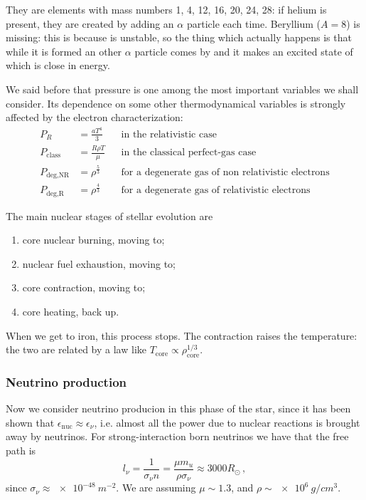 \documentclass[main.tex]{subfiles}
\begin{document}
\begin{bluebox}
They are elements with mass numbers 1, 4, 12, 16, 20, 24, 28: if helium is present, they are created by adding an \(\alpha \) particle each time. Beryllium (\(A = 8\)) is missing: this is because  is unstable, so the thing which actually happens is that while it is formed an other \(\alpha \) particle comes by and it makes an excited state of  which is close in energy.
\end{bluebox}
    
We said before that pressure is one among the most important variables we shall consider. Its dependence on some other thermodynamical variables is strongly affected by the electron characterization:
%
\begin{subequations}
\begin{align}
P_R &=\frac{aT^4}{3} && \text{in the relativistic case}\\
P_{\text{class}} &=\frac{R\rho T}{\mu} && \text{in the classical perfect-gas case}\\
P_{\text{deg,NR}} &=\rho^{\frac{5}{3}} && \text{for a degenerate gas of non relativistic electrons} \\
P_{\text{deg,R}} &=\rho^{\frac{4}{3}} && \text{for a degenerate gas of relativistic electrons}
\end{align}
\end{subequations}

The main nuclear stages of stellar evolution are 
\begin{enumerate}
    \item core nuclear burning, moving to;
    \item nuclear fuel exhaustion, moving to;
    \item core contraction, moving to;
    \item core heating, back up.
\end{enumerate}

When we get to iron, this process stops.
The contraction raises the temperature: the two are related by a law like \(T _{\text{core}} \propto \rho _{\text{core}}^{1/3}\). 

\subsubsection{Neutrino production}

Now we consider neutrino producion in this phase of the star, since it has been shown that $\epsilon_{\text{nuc}}\approx \epsilon_\nu$, i.e. almost all the power due to nuclear reactions is brought away by neutrinos.
For strong-interaction born neutrinos we have that the free path is
%
\begin{equation}
    l_\nu=\frac{1}{\sigma_\nu n}=\frac{\mu m_u}{\rho\sigma_\nu}\approx 3000 R_{\odot}\,,
\end{equation}
%
since \(\sigma_{\nu } \approx \SI{e-48}{m^{-2}}\).
We are assuming \(\mu \sim 1.3\), and \(\rho \sim \SI{e6}{g/cm^3}\).
\end{document}

